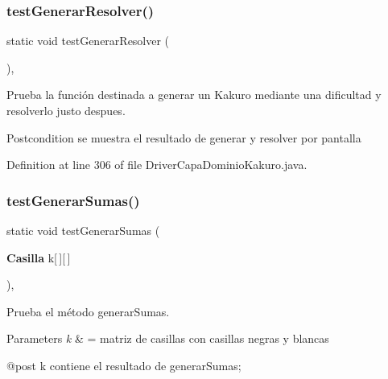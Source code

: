 \subsubsection{test\+Generar\+Resolver()}
{\footnotesize\ttfamily static void test\+Generar\+Resolver (\begin{DoxyParamCaption}{ }\end{DoxyParamCaption})\hspace{0.3cm}{\ttfamily [inline]}, {\ttfamily [static]}}



Prueba la función destinada a generar un Kakuro mediante una dificultad y resolverlo justo despues. 

\begin{DoxyPostcond}{Postcondition}
se muestra el resultado de generar y resolver por pantalla 
\end{DoxyPostcond}


Definition at line 306 of file Driver\+Capa\+Dominio\+Kakuro.\+java.

\mbox{\label{class_dominio_1_1controladores_1_1_drivers_1_1_driver_capa_dominio_kakuro_ad419fcca981c085e88799f107cea6c7c}} 
\subsubsection{test\+Generar\+Sumas()}
{\footnotesize\ttfamily static void test\+Generar\+Sumas (\begin{DoxyParamCaption}\item[{\textbf{ Casilla}}]{k[$\,$][$\,$] }\end{DoxyParamCaption})\hspace{0.3cm}{\ttfamily [inline]}, {\ttfamily [static]}}



Prueba el método generar\+Sumas. 


\begin{DoxyParams}{Parameters}
{\em k} & = matriz de casillas con casillas negras y blancas \begin{DoxyVerb}@post k contiene el resultado de generarSumas;\end{DoxyVerb}
 \\
\hline
\end{DoxyParams}


